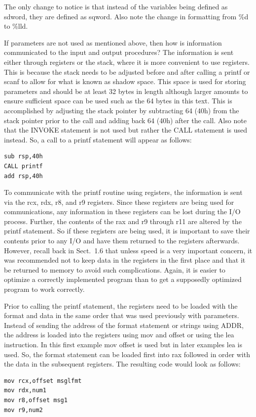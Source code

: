 \documentclass[10pt]{book}
\begin{document}
The only change to notice is that instead of the variables being defined as sdword, they are defined as sqword. Also note the change in formatting from \%d to \%lld.

If parameters are not used as mentioned above, then how is information communicated to the input and output procedures? The information is sent either through registers or the stack, where it is more convenient to use registers. This is because the stack needs to be adjusted before and after calling a printf or scanf to allow for what is known as shadow space. This space is used for storing parameters and should be at least 32 bytes in length although larger amounts to ensure sufficient space can be used such as the 64 bytes in this text. This is accomplished by adjusting the stack pointer by subtracting 64 (40h) from the stack pointer prior to the call and adding back 64 (40h) after the call. Also note that the INVOKE statement is not used but rather the CALL statement is used instead. So, a call to a printf statement will appear as follows:
\begin{verbatim}
sub rsp,40h
CALL printf
add rsp,40h
\end{verbatim}

To communicate with the printf routine using registers, the information is sent via the rcx, rdx, r8, and r9 registers. Since these registers are being used for communications, any information in these registers can be lost during the I/O process. Further, the contents of the rax and r9 through r11 are altered by the printf statement. So if these registers are being used, it is important to save their contents prior to any I/O and have them returned to the registers afterwards. However, recall back in Sect.~1.6 that unless speed is a very important concern, it was recommended not to keep data in the registers in the first place and that it be returned to memory to avoid such complications. Again, it is easier to optimize a correctly implemented program than to get a supposedly optimized program to work correctly.

Prior to calling the printf statement, the registers need to be loaded with the format and data in the same order that was used previously with parameters. Instead of sending the address of the format statement or strings using ADDR, the address is loaded into the registers using mov and offset or using the lea instruction. In this first example mov offset is used but in later examples lea is used. So, the format statement can be loaded first into rax followed in order with the data in the subsequent registers. The resulting code would look as follows:
\begin{verbatim}
mov rcx,offset msglfmt
mov rdx,num1
mov r8,offset msg1
mov r9,num2
\end{verbatim}
\end{document}
